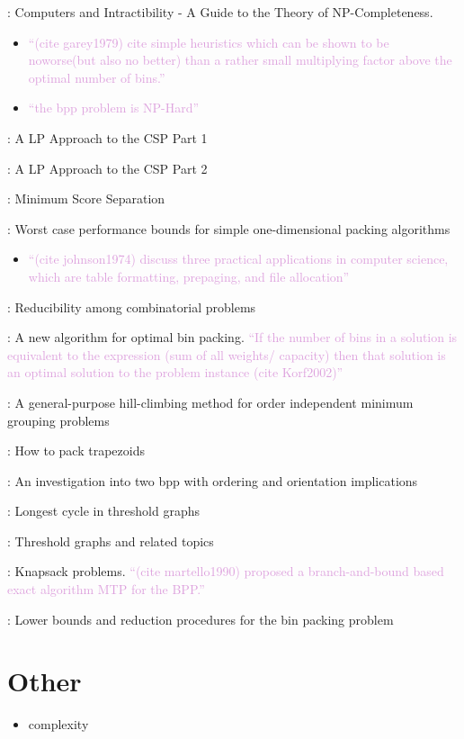 \documentclass{llncs}
\begin{document}
\cite{garey1979}: Computers and Intractibility - A Guide to the Theory of NP-Completeness. 
\begin{itemize}
	\item \textcolor{Plum}{``(cite garey1979) cite simple heuristics which can be shown to be noworse(but also no better) than a rather small multiplying factor above the optimal number of bins.''}
	\item \textcolor{Plum}{``the bpp problem is NP-Hard''}
\end{itemize}

\cite{gilmore1961}: A LP Approach to the CSP Part 1

\cite{gilmore1963}: A LP Approach to the CSP Part 2

\cite{goulimis2004}: Minimum Score Separation

\cite{johnson1974}: Worst case performance bounds for simple one-dimensional packing algorithms
\begin{itemize}
	\item \textcolor{Plum}{ ``(cite johnson1974) discuss three practical applications in computer science, which are table formatting, prepaging, and file allocation''}
\end{itemize}

\cite{karp1972}: Reducibility among combinatorial problems

\cite{korf2002}: A new algorithm for optimal bin packing. \textcolor{Plum}{``If the number of bins in a solution is equivalent to the expression (sum of all weights/ capacity) then that solution is an optimal solution to the problem instance (cite Korf2002)''} 

\cite{lewis2009}: A general-purpose hill-climbing method for order independent minimum grouping problems

\cite{lewis2017}: How to pack trapezoids

\cite{lewis2011}: An investigation into two bpp with ordering and orientation implications

\cite{mahadev1994}: Longest cycle in threshold graphs

\cite{mahadev1995}: Threshold graphs and related topics

\cite{martello1990a}: Knapsack problems.\textcolor{Plum}{ ``(cite martello1990) proposed a branch-and-bound based exact algorithm MTP for the BPP.''} 

\cite{martello1990b}: Lower bounds and reduction procedures for the bin packing problem

\section{Other}
\begin{itemize}
	\item complexity
\end{itemize}



\end{document}
